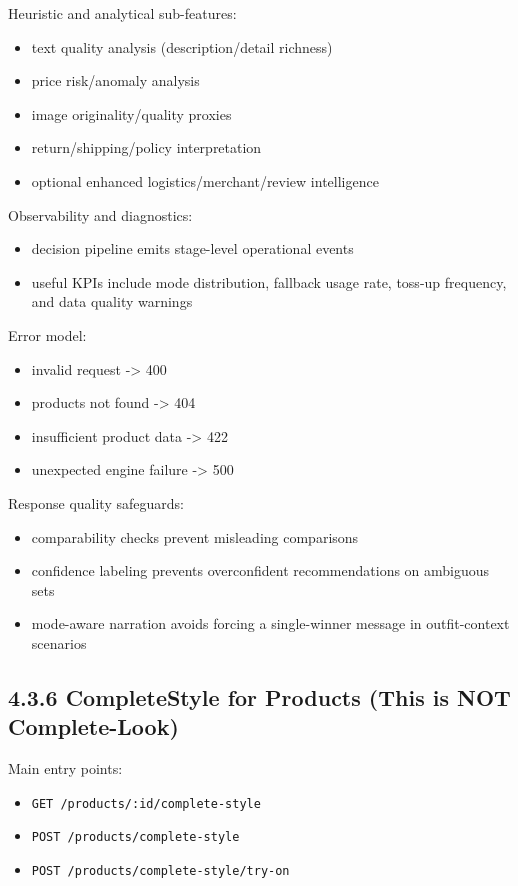 \documentclass[12pt,a4paper]{report}
\begin{document}
Heuristic and analytical sub-features:

\begin{itemize}
\item text quality analysis (description/detail richness)
\item price risk/anomaly analysis
\item image originality/quality proxies
\item return/shipping/policy interpretation
\item optional enhanced logistics/merchant/review intelligence
\end{itemize}

Observability and diagnostics:

\begin{itemize}
\item decision pipeline emits stage-level operational events
\item useful KPIs include mode distribution, fallback usage rate, toss-up frequency, and data quality warnings
\end{itemize}

Error model:

\begin{itemize}
\item invalid request -> 400
\item products not found -> 404
\item insufficient product data -> 422
\item unexpected engine failure -> 500
\end{itemize}

Response quality safeguards:

\begin{itemize}
\item comparability checks prevent misleading comparisons
\item confidence labeling prevents overconfident recommendations on ambiguous sets
\item mode-aware narration avoids forcing a single-winner message in outfit-context scenarios
\end{itemize}

\subsection{4.3.6 CompleteStyle for Products (This is NOT Complete-Look)}
Main entry points:

\begin{itemize}
\item \texttt{GET /products/:id/complete-style}
\item \texttt{POST /products/complete-style}
\item \texttt{POST /products/complete-style/try-on}
\end{itemize}
\end{document}
